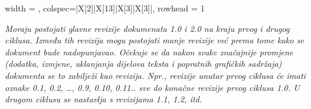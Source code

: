 \begin{longtblr}[
				label=none
			]{
				width = \textwidth, 
				colspec={|X[2]|X[13]|X[3]|X[3]|}, 
				rowhead = 1
			}
			
		\end{longtblr}
	
	
		\textit{Moraju postojati glavne revizije dokumenata 1.0 i 2.0 na kraju prvog i drugog ciklusa. Između tih revizija mogu postojati manje revizije već prema tome kako se dokument bude nadopunjavao. Očekuje se da nakon svake značajnije promjene (dodatka, izmjene, uklanjanja dijelova teksta i popratnih grafičkih sadržaja) dokumenta se to zabilježi kao revizija. Npr., revizije unutar prvog ciklusa će imati oznake 0.1, 0.2, …, 0.9, 0.10, 0.11.. sve do konačne revizije prvog ciklusa 1.0. U drugom ciklusu se nastavlja s revizijama 1.1, 1.2, itd.}